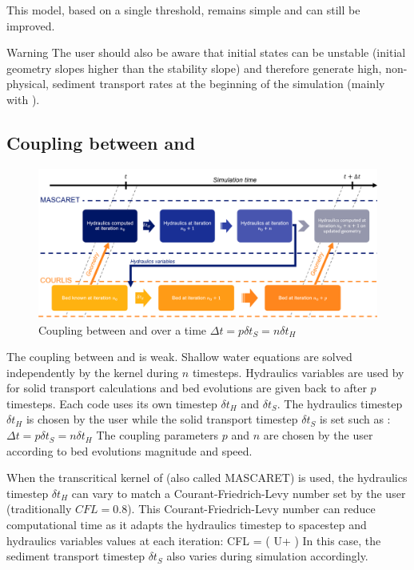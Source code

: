 This model, based on a single threshold, remains simple and can still be improved. 

\begin{WarningBlock}{Warning}
	The user should also be aware that initial states can be unstable (initial geometry slopes higher than the stability slope) and therefore generate high, non-physical, sediment transport rates at the beginning of the simulation (mainly with \Csuspension). 
\end{WarningBlock}
\subsection{Coupling between \courlis and \mascaret}
\label{coupling}
\begin{figure}[hbt!]
	\centering
	\includegraphics[width=\textwidth]{./graphics/coupling.png}
	\caption{Coupling between \courlis and \mascaret over a time $\Delta t = p \delta t_S = n \delta t_H$}
	\label{fig:coupling}
\end{figure}

The coupling between \courlis and \mascaret is weak. 
Shallow water equations are solved independently by the \mascaret kernel during $n$ timesteps. Hydraulics variables are used by \courlis for solid transport calculations and bed evolutions are given back to \mascaret after $p$ timesteps. Each code uses its own timestep $\delta t_H$ and $\delta t_S$. The hydraulics timestep $\delta t_H$ is chosen by the user while the solid transport timestep $\delta t_S$ is set such as :
$\Delta t = p \delta t_S = n \delta t_H$
The coupling parameters $p$ and $n$ are chosen by the user according to bed evolutions magnitude and speed. 

When the transcritical kernel of \mascaret (also called MASCARET) is used, the hydraulics timestep $\delta t_H$ can vary to match a Courant-Friedrich-Levy number set by the user (traditionally $CFL = 0.8$). 
This Courant-Friedrich-Levy number can reduce computational time as it adapts the hydraulics timestep to spacestep and hydraulics variables values at each iteration:
\bequ
	CFL = \left(  U+ \right)  
	\label{eq:CFL}
\eequ
In this case, the sediment transport timestep $\delta t_S$ also varies during simulation accordingly. 




